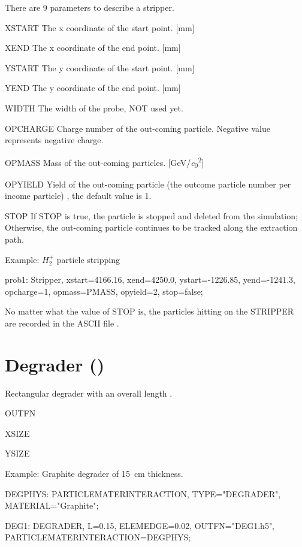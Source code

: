  There are 9 parameters to describe a stripper.
\begin{kdescription}
\item[XSTART]
The x coordinate of the start point. [\si{\milli\meter}]
 \item[XEND]
The x coordinate of the end point. [\si{\milli\meter}]
\item[YSTART]
The y coordinate of the start point. [\si{\milli\meter}]
 \item[YEND]
The y coordinate of the end point. [\si{\milli\meter}]
\item[WIDTH]
 The width of the probe, NOT used yet.
\item[OPCHARGE]
Charge number of the out-coming particle. Negative  value represents negative charge.
\item[OPMASS]
Mass of the out-coming particles. [\si{\giga\electronvolt/\clight\squared}]
\item[OPYIELD]
Yield of the out-coming particle (the outcome particle number per income particle) , the default value is 1.
\item[STOP]
If STOP is true, the particle is stopped and deleted from the simulation;
Otherwise, the out-coming particle continues to be tracked along the extraction path.
\end{kdescription}

\noindent Example: $H_2^+$ particle stripping
\begin{example}
prob1: Stripper, xstart=4166.16, xend=4250.0,
ystart=-1226.85, yend=-1241.3,
opcharge=1, opmass=PMASS, opyield=2, stop=false;
\end{example}

No matter what the value of STOP is, the particles hitting on the STRIPPER are recorded in the ASCII file .



\clearpage
\section{Degrader (\opalt)}
Rectangular degrader with an overall length .
\begin{kdescription}
\item[OUTFN]
\item[XSIZE]
\item[YSIZE]
\end{kdescription}
\noindent Example: Graphite degrader of \SI{15}{\centi\meter} thickness.
\begin{example}
DEGPHYS: PARTICLEMATERINTERACTION, TYPE="DEGRADER", MATERIAL="Graphite";

DEG1: DEGRADER, L=0.15, ELEMEDGE=0.02, OUTFN="DEG1.h5", PARTICLEMATERINTERACTION=DEGPHYS;
\end{example}



